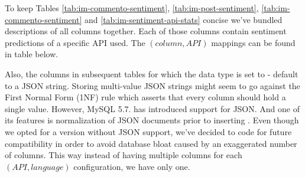 To keep Tables \ref{tab:im-commento-sentiment}, \ref{tab:im-post-sentiment}, \ref{tab:im-commento-sentiment} and \ref{tab:im-sentiment-api-stats} concise we've bundled descriptions of all  columns together. 
Each of those columns contain sentiment predictions of a specific API used. 
The $(column, API)$ mappings can be found in table below.


Also, the columns in subsequent tables for which the data type is set to - default to a JSON string. 
Storing multi-value JSON strings might seem to go against the First Normal Form (1NF) rule which asserts that every column should hold a single value.
However, MySQL 5.7. has introduced support for JSON. 
And one of its features is normalization of JSON documents prior to inserting \cite{MySQLjson}.
Even though we opted for a version without JSON support, we've decided to code for future compatibility in order to avoid database bloat caused by an exaggerated number of columns. 
This way instead of having multiple columns for each $(API, language)$ configuration, we have only one.


\restoregeometry




\newpage